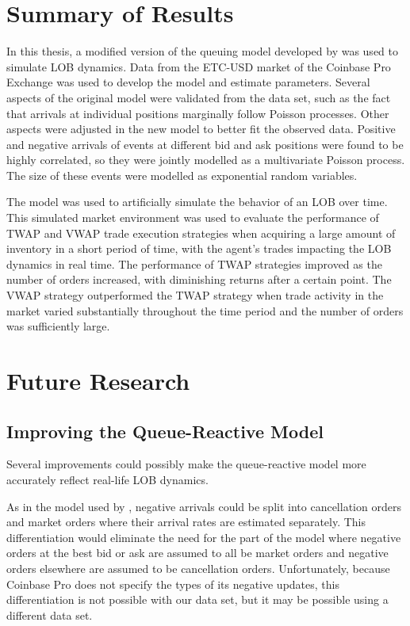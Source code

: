 \section{Summary of Results}
In this thesis, a modified version of the queuing model developed by \cite{A6} was used to simulate LOB dynamics. Data from the ETC-USD market of the Coinbase Pro Exchange was used to develop the model and estimate parameters. Several aspects of the original model were validated from the data set, such as the fact that arrivals at individual positions marginally follow Poisson processes. Other aspects were adjusted in the new model to better fit the observed data. Positive and negative arrivals of events at different bid and ask positions were found to be highly correlated, so they were jointly modelled as a multivariate Poisson process. The size of these events were modelled as exponential random variables. 

The model was used to artificially simulate the behavior of an LOB over time. This simulated market environment was used to evaluate the performance of TWAP and VWAP trade execution strategies when acquiring a large amount of inventory in a short period of time, with the agent's trades impacting the LOB dynamics in real time. The performance of TWAP strategies improved as the number of orders increased, with diminishing returns after a certain point. The VWAP strategy outperformed the TWAP strategy when trade activity in the market varied substantially throughout the time period and the number of orders was sufficiently large.

\section{Future Research}
\subsection{Improving the Queue-Reactive Model}
Several improvements could possibly make the queue-reactive model more accurately reflect real-life LOB dynamics. 

As in the model used by \cite{A6}, negative arrivals could be split into cancellation orders and market orders where their arrival rates are estimated separately. This differentiation would eliminate the need for the part of the model where negative orders at the best bid or ask are assumed to all be market orders and negative orders elsewhere are assumed to be cancellation orders. Unfortunately, because Coinbase Pro does not specify the types of its negative updates, this differentiation is not possible with our data set, but it may be possible using a different data set.

